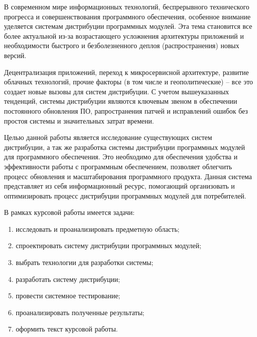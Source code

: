 \Introduction

В современном мире информационных технологий, беспрерывного технического прогресса и совершенствования программного обеспечения, особенное внимание уделяется системам дистрибуции программных модулей. Эта тема становится все более актуальной из-за возрастающего усложнения архитектуры приложений и необходимости быстрого и безболезненного деплоя (распространения) новых версий.

Децентрализация приложений, переход к микросервисной архитектуре, развитие облачных технологий, прочие факторы (в том числе и геополитические) – все это создает новые вызовы для систем дистрибуции. С учетом вышеуказанных тенденций, системы дистрибуции являются ключевым звеном в обеспечении постоянного обновления ПО, рапространения патчей и исправлений ошибок без простоя системы и значительных затрат времени. 

Целью данной работы является исследование существующих систем дистрибуции, а так же разработка системы дистрибуции программных модулей для программного обеспечения. Это необходимо для обеспечения удобства и эффективности работы с программным обеспечением, позволяет облегчить процесс обновления и масштабирования программного продукта. Данная система представляет из себя информационный ресурс, помогающий организовать и оптимизировать процесс дистрибуции программных модулей для потребителей.

В рамках курсовой работы имеется задачи:

\renewcommand{\labelenumi}{\arabic{enumi})}
\renewcommand{\labelenumii}{\asbuk{enumii})}

\begin{enumerate}
\item исследовать и проанализировать предметную область;
\item спроектировать систему дистрибуции программных модулей;
\item выбрать технологии для разработки системы;
\item разработать систему дистрибуции;
\item провести системное тестирование;
\item проанализировать полученные результаты;
\item оформить текст курсовой работы.
\end{enumerate}
